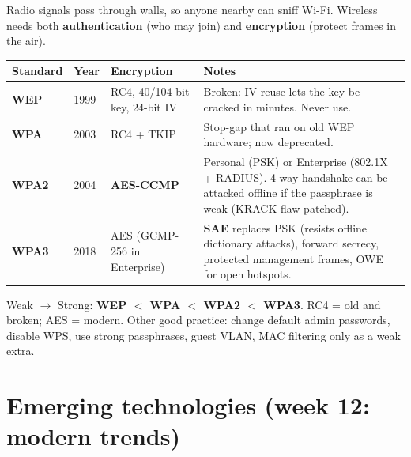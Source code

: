 \documentclass[10pt]{article}
\begin{document}
Radio signals pass through walls, so anyone nearby can sniff Wi-Fi. Wireless needs both \textbf{authentication} (who may join) and \textbf{encryption} (protect frames in the air).

\begin{tabularx}{\linewidth}{@{}>{\bfseries}lllX@{}}
\toprule
Standard & Year & Encryption & Notes\\\midrule
WEP & 1999 & RC4, 40/104-bit key, 24-bit IV & Broken: IV reuse lets the key be cracked in minutes. Never use.\\
WPA & 2003 & RC4 + TKIP & Stop-gap that ran on old WEP hardware; now deprecated.\\
WPA2 & 2004 & \textbf{AES-CCMP} & Personal (PSK) or Enterprise (802.1X + RADIUS). 4-way handshake can be attacked offline if the passphrase is weak (KRACK flaw patched).\\
WPA3 & 2018 & AES (GCMP-256 in Enterprise) & \textbf{SAE} replaces PSK (resists offline dictionary attacks), forward secrecy, protected management frames, OWE for open hotspots.\\
\bottomrule
\end{tabularx}
\begin{mnemonic}
Weak $\to$ Strong: \textbf{WEP $<$ WPA $<$ WPA2 $<$ WPA3}. RC4 = old and broken; AES = modern. Other good practice: change default admin passwords, disable WPS, use strong passphrases, guest VLAN, MAC filtering only as a weak extra.
\end{mnemonic}


\newpage
\section{Emerging technologies (week 12: modern trends)}
\end{document}
